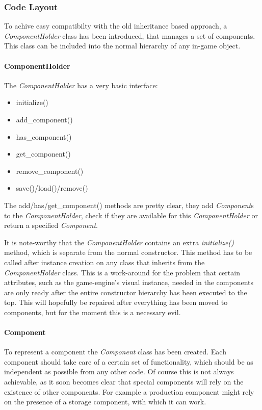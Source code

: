 \subsubsection{Code Layout}
To achive easy compatibilty with the old inheritance based approach, a \textit{ComponentHolder} class has been
introduced, that manages a set of components. This class can be included into the normal hierarchy of any in-game object.

\paragraph{ComponentHolder}
The \textit{ComponentHolder} has a very basic interface:
\begin{itemize}
    \item initialize()
    \item add\_component()
    \item has\_component()
    \item get\_component()
    \item remove\_component()
    \item save()/load()/remove()
\end{itemize}
The add/has/get\_component() methods are pretty clear, they add \textit{Component}s to the \textit{ComponentHolder}, check if
they are available for this \textit{ComponentHolder} or return a specified \textit{Component}.

It is note-worthy that the \textit{ComponentHolder} contains an extra \textit{initialize()} method, which is separate from the
normal constructor. This method has to be called after instance creation on any class that inherits from the
\textit{ComponentHolder} class. This is a work-around for the problem that certain attributes, such as the game-engine's
visual instance, needed in the components are only ready after the entire constructor hierarchy has been executed to the
top. This will hopefully be repaired after everything has been moved to components, but for the moment this is a
necessary evil.

\paragraph{Component}
To represent a component the \textit{Component} class has been created. Each component should take care of a certain set
of functionality, which should be as independent as possible from any other code. Of course this is not always
achievable, as it soon becomes clear that special components will rely on the existence of other components. For example
a production component might rely on the presence of a storage component, with which it can work.

